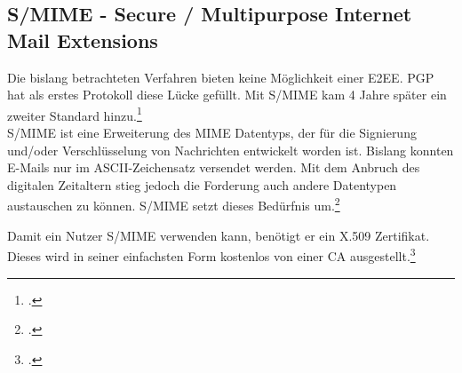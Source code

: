 \documentclass  [paper=a4,
				fontsize=12pt,
				listof=totoc,
				bibliography=totoc
				]{scrreprt}
\begin{document}


				
				
				
			 
				
				
				
%				
%				
%				
%				
				
				
				
			\subsection{S/MIME - Secure / Multipurpose Internet Mail Extensions}
			
				Die bislang betrachteten Verfahren bieten keine Möglichkeit einer \ac{E2EE}. \ac{PGP} hat als erstes Protokoll diese Lücke gefüllt. Mit \ac{S/MIME} kam 4 Jahre später ein zweiter Standard hinzu.\footcite[Vgl.][]{Duevel}
				\medskip\\
							
				\ac{S/MIME} ist eine Erweiterung des MIME Datentyps, der für die Signierung und/oder Verschlüsselung von Nachrichten entwickelt worden ist.
				Bislang konnten E-Mails nur im ASCII-Zeichensatz versendet werden. Mit dem Anbruch des digitalen Zeitaltern stieg jedoch die Forderung auch andere Datentypen austauschen zu können. \ac{S/MIME} setzt dieses Bedürfnis um.\footcite[Vgl.][S. 57-60]{Schwenk}
				\medskip
				
				Damit ein Nutzer \ac{S/MIME} verwenden kann, benötigt er ein X.509 Zertifikat. Dieses wird in seiner einfachsten Form kostenlos von einer \ac{CA} ausgestellt.\footcite[Vgl.][]{Duevel}
				
\end{document}
